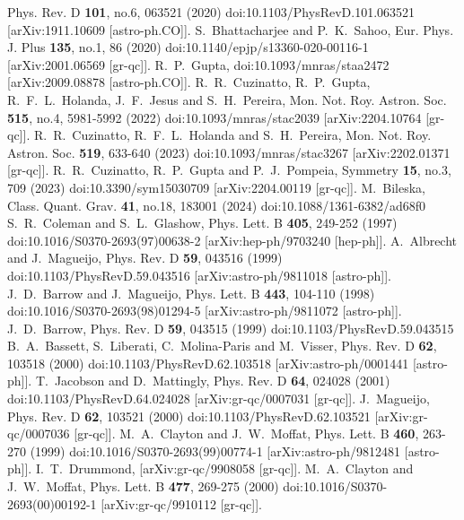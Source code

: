 \documentclass[jkps,preprint,fleqn]{revtex4}
\begin{document}
\begin{CJK*}{UTF8}{gbsn}
\begin{thebibliography}{999}
Phys. Rev. D \textbf{101}, no.6, 063521 (2020)
doi:10.1103/PhysRevD.101.063521
[arXiv:1911.10609 [astro-ph.CO]].
S.~Bhattacharjee and P.~K.~Sahoo,
Eur. Phys. J. Plus \textbf{135}, no.1, 86 (2020)
doi:10.1140/epjp/s13360-020-00116-1
[arXiv:2001.06569 [gr-qc]].
R.~P.~Gupta,
doi:10.1093/mnras/staa2472
[arXiv:2009.08878 [astro-ph.CO]].
R.~R.~Cuzinatto, R.~P.~Gupta, R.~F.~L.~Holanda, J.~F.~Jesus and S.~H.~Pereira,
Mon. Not. Roy. Astron. Soc. \textbf{515}, no.4, 5981-5992 (2022)
doi:10.1093/mnras/stac2039
[arXiv:2204.10764 [gr-qc]].
R.~R.~Cuzinatto, R.~F.~L.~Holanda and S.~H.~Pereira,
Mon. Not. Roy. Astron. Soc. \textbf{519}, 633-640 (2023)
doi:10.1093/mnras/stac3267
[arXiv:2202.01371 [gr-qc]].
R.~R.~Cuzinatto, R.~P.~Gupta and P.~J.~Pompeia,
Symmetry \textbf{15}, no.3, 709 (2023)
doi:10.3390/sym15030709
[arXiv:2204.00119 [gr-qc]].
M.~Bileska,
Class. Quant. Grav. \textbf{41}, no.18, 183001 (2024)
doi:10.1088/1361-6382/ad68f0
S.~R.~Coleman and S.~L.~Glashow,
Phys. Lett. B \textbf{405}, 249-252 (1997)
doi:10.1016/S0370-2693(97)00638-2
[arXiv:hep-ph/9703240 [hep-ph]].
A.~Albrecht and J.~Magueijo,
Phys. Rev. D \textbf{59}, 043516 (1999)
doi:10.1103/PhysRevD.59.043516
[arXiv:astro-ph/9811018 [astro-ph]].
J.~D.~Barrow and J.~Magueijo,
Phys. Lett. B \textbf{443}, 104-110 (1998)
doi:10.1016/S0370-2693(98)01294-5
[arXiv:astro-ph/9811072 [astro-ph]].
J.~D.~Barrow,
Phys. Rev. D \textbf{59}, 043515 (1999)
doi:10.1103/PhysRevD.59.043515
B.~A.~Bassett, S.~Liberati, C.~Molina-Paris and M.~Visser,
Phys. Rev. D \textbf{62}, 103518 (2000)
doi:10.1103/PhysRevD.62.103518
[arXiv:astro-ph/0001441 [astro-ph]].
T.~Jacobson and D.~Mattingly,
Phys. Rev. D \textbf{64}, 024028 (2001)
doi:10.1103/PhysRevD.64.024028
[arXiv:gr-qc/0007031 [gr-qc]].
J.~Magueijo,
Phys. Rev. D \textbf{62}, 103521 (2000)
doi:10.1103/PhysRevD.62.103521
[arXiv:gr-qc/0007036 [gr-qc]].
M.~A.~Clayton and J.~W.~Moffat,
Phys. Lett. B \textbf{460}, 263-270 (1999)
doi:10.1016/S0370-2693(99)00774-1
[arXiv:astro-ph/9812481 [astro-ph]].
I.~T.~Drummond,
[arXiv:gr-qc/9908058 [gr-qc]].
M.~A.~Clayton and J.~W.~Moffat,
Phys. Lett. B \textbf{477}, 269-275 (2000)
doi:10.1016/S0370-2693(00)00192-1
[arXiv:gr-qc/9910112 [gr-qc]].

\end{thebibliography}
\end{CJK*}
\end{document}
